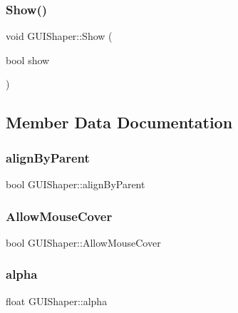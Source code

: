 \subsubsection{\texorpdfstring{Show()}{Show()}}
{\footnotesize\ttfamily void G\+U\+I\+Shaper\+::\+Show (\begin{DoxyParamCaption}\item[{bool}]{show }\end{DoxyParamCaption})}



\subsection{Member Data Documentation}
\hypertarget{class_g_u_i_shaper_a580e358d23a681f5cb7b5202baca233e}{}\label{class_g_u_i_shaper_a580e358d23a681f5cb7b5202baca233e} 
\subsubsection{\texorpdfstring{align\+By\+Parent}{alignByParent}}
{\footnotesize\ttfamily bool G\+U\+I\+Shaper\+::align\+By\+Parent}

\hypertarget{class_g_u_i_shaper_ae5c6a8145f4ba27a6a0b2f04d7d38b5b}{}\label{class_g_u_i_shaper_ae5c6a8145f4ba27a6a0b2f04d7d38b5b} 
\subsubsection{\texorpdfstring{Allow\+Mouse\+Cover}{AllowMouseCover}}
{\footnotesize\ttfamily bool G\+U\+I\+Shaper\+::\+Allow\+Mouse\+Cover}

\hypertarget{class_g_u_i_shaper_a27fd95d57c29c638746da0517fc14603}{}\label{class_g_u_i_shaper_a27fd95d57c29c638746da0517fc14603} 
\subsubsection{\texorpdfstring{alpha}{alpha}}
{\footnotesize\ttfamily float G\+U\+I\+Shaper\+::alpha}

\hypertarget{class_g_u_i_shaper_af8185061a4ea7ead37b42e3561179da4}{}\label{class_g_u_i_shaper_af8185061a4ea7ead37b42e3561179da4} 
